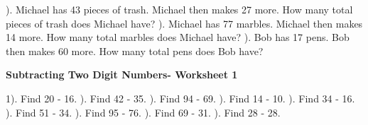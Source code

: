 \documentclass{article}%
\begin{document}
\newline%
). Michael has 43 pieces of trash. Michael then makes 27 more. How many total pieces of trash does Michael have?%
\newline%
\newline%
). Michael has 77 marbles. Michael then makes 14 more. How many total marbles does Michael have?%
\newline%
\newline%
). Bob has 17 pens. Bob then makes 60 more. How many total pens does Bob have?%
\newline%
\newline%
\newline%
\pagebreak%
\large%
\begin{center}%
\textbf{Subtracting Two Digit Numbers- Worksheet 1}%
\newline%
\newline%
\newline%
\end{center} \normalsize%
1). Find 20 {-} 16.%
\newline%
\newline%
). Find 42 {-} 35.%
\newline%
\newline%
). Find 94 {-} 69.%
\newline%
\newline%
). Find 14 {-} 10.%
\newline%
\newline%
). Find 34 {-} 16.%
\newline%
\newline%
). Find 51 {-} 34.%
\newline%
\newline%
). Find 95 {-} 76.%
\newline%
\newline%
). Find 69 {-} 31.%
\newline%
\newline%
). Find 28 {-} 28.%
\newline%
\end{document}
